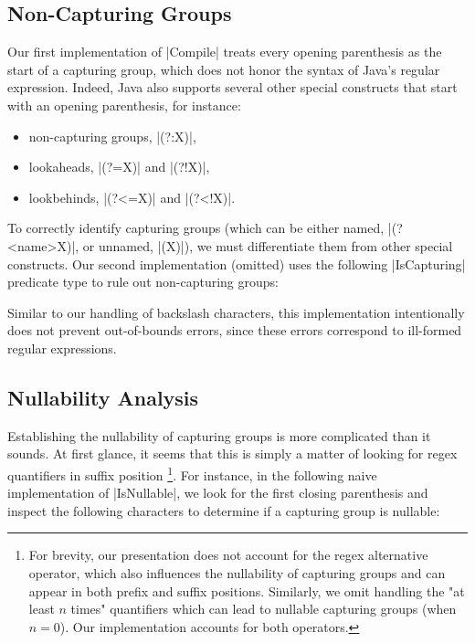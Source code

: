 \subsection{Non-Capturing Groups}
\label{subsec:non-capturing-groups}

Our first implementation of |Compile| treats every opening parenthesis as the start of a capturing group, which does not honor the syntax of Java's regular expression.
Indeed, Java also supports several other special constructs that start with an opening parenthesis, for instance:

\begin{itemize}
  \item non-capturing groups, |(?:X)|,
  \item lookaheads, |(?=X)| and |(?!X)|,
  \item lookbehinds, |(?<=X)| and |(?<!X)|.
\end{itemize}

\noindent
To correctly identify capturing groups (which can be either named, |(?<name>X)|, or unnamed, |(X)|), we must differentiate them from other special constructs.
Our second implementation (omitted) uses the following |IsCapturing| predicate type to rule out non-capturing groups:

\regexIsCapturing

\noindent
Similar to our handling of backslash characters, this implementation intentionally does not prevent out-of-bounds errors, since these errors correspond to ill-formed regular expressions.

\subsection{Nullability Analysis}

Establishing the nullability of capturing groups is more complicated than it sounds.
At first glance, it seems that this is simply a matter of looking for regex quantifiers in suffix position%
\footnote{
For brevity, our presentation does not account for the regex alternative operator, which also influences the nullability of capturing groups and can appear in both prefix and suffix positions.
Similarly, we omit handling the "at least $n$ times" quantifiers which can lead to nullable capturing groups (when $n=0$).
Our implementation accounts for both operators.
}.
For instance, in the following naive implementation of |IsNullable|, we look for the first closing parenthesis and inspect the following characters to determine if a capturing group is nullable:

